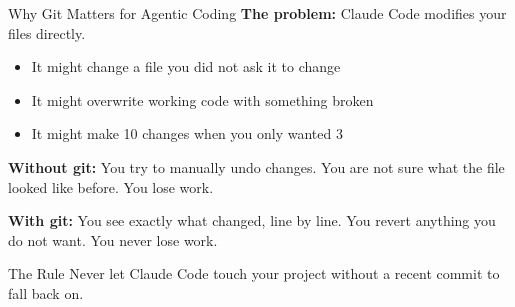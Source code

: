 \documentclass[aspectratio=169, 11pt]{beamer}
\begin{document}

\begin{frame}{Why Git Matters for Agentic Coding}
  \textbf{The problem:} Claude Code modifies your files directly.

  \vspace{0.5em}
  \begin{itemize}
    \item It might change a file you did not ask it to change
    \item It might overwrite working code with something broken
    \item It might make 10 changes when you only wanted 3
  \end{itemize}

  \vspace{0.8em}
  \textbf{Without git:} You try to manually undo changes. You are not sure what the file looked like before. You lose work.

  \vspace{0.5em}
  \textbf{With git:} You see exactly what changed, line by line. You revert anything you do not want. You never lose work.

  \vspace{0.8em}
  \begin{alertblock}{The Rule}
    Never let Claude Code touch your project without a recent commit to fall back on.
  \end{alertblock}
\end{frame}
\end{document}

